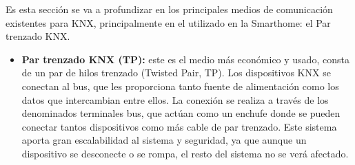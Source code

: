 Es esta sección se va a profundizar en los principales medios de comunicación existentes para KNX, principalmente en el utilizado en la Smarthome: el Par trenzado KNX.

\begin{itemize}
    \item \textbf{Par trenzado KNX (TP):} este es el medio más económico y usado, consta de un par de hilos trenzado (Twisted Pair, TP). Los dispositivos KNX se conectan al bus, que les proporciona tanto fuente de alimentación como los datos que intercambian entre ellos. La conexión se realiza a través de los denominados terminales bus, que actúan como un enchufe donde se pueden conectar tantos dispositivos como más cable de par trenzado. Este sistema aporta gran escalabilidad al sistema y seguridad, ya que aunque un dispositivo se desconecte o se rompa, el resto del sistema no se verá afectado.
    

\end{itemize}
